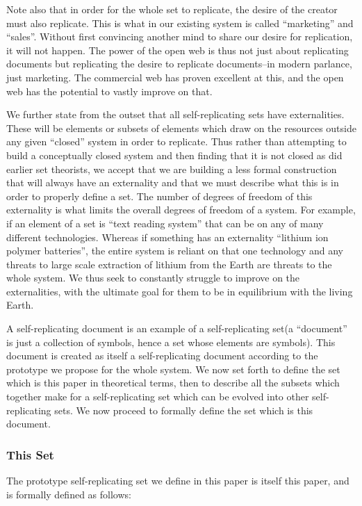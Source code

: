 \documentclass[12pt,a4paper]{amsart}
\numberwithin{equation}{section}
\begin{document}
Note also that in order for the whole set to replicate, the desire of
the creator must also replicate. This is what in our existing system is
called ``marketing'' and ``sales''. Without first convincing another
mind to share our desire for replication, it will not happen. The power
of the open web is thus not just about replicating documents but
replicating the desire to replicate documents--in modern parlance, just
marketing. The commercial web has proven excellent at this, and the open
web has the potential to vastly improve on that.

We further state from the outset that all self-replicating sets have
externalities. These will be elements or subsets of elements which draw
on the resources outside any given ``closed'' system in order to
replicate. Thus rather than attempting to build a conceptually closed
system and then finding that it is not closed as did earlier set
theorists, we accept that we are building a less formal construction
that will always have an externality and that we must describe what this
is in order to properly define a set. The number of degrees of freedom
of this externality is what limits the overall degrees of freedom of a
system. For example, if an element of a set is ``text reading system''
that can be on any of many different technologies. Whereas if something
has an externality ``lithium ion polymer batteries'', the entire system
is reliant on that one technology and any threats to large scale
extraction of lithium from the Earth are threats to the whole system. We
thus seek to constantly struggle to improve on the externalities, with
the ultimate goal for them to be in equilibrium with the living Earth.

A self-replicating document is an example of a self-replicating set(a
``document'' is just a collection of symbols, hence a set whose elements
are symbols). This document is created as itself a self-replicating
document according to the prototype we propose for the whole system. We
now set forth to define the set which is this paper in theoretical
terms, then to describe all the subsets which together make for a
self-replicating set which can be evolved into other self-replicating
sets. We now proceed to formally define the set which is this document.

\subsubsection{This Set}\label{this-set}

The prototype self-replicating set we define in this paper is itself
this paper, and is formally defined as follows:
\end{document}
